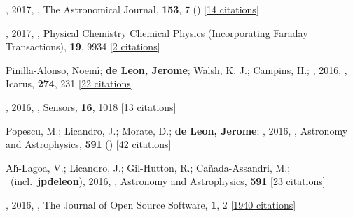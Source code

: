 \item[{\color{numcolor}\scriptsize73}] , 2017, , The Astronomical Journal, \textbf{153}, 7 () [\href{https://ui.adsabs.harvard.edu/abs/2017AJ....153....7Y}{14 citations}]

\item[{\color{numcolor}\scriptsize72}] , 2017, , Physical Chemistry Chemical Physics (Incorporating Faraday Transactions), \textbf{19}, 9934 [\href{https://ui.adsabs.harvard.edu/abs/2017PCCP...19.9934D}{2 citations}]

\item[{\color{numcolor}\scriptsize71}] Pinilla-Alonso, Noem{\'\i}; \textbf{de Leon, Jerome}; Walsh, K. J.; Campins, H.; \etal, 2016, , Icarus, \textbf{274}, 231 [\href{https://ui.adsabs.harvard.edu/abs/2016Icar..274..231P}{22 citations}]

\item[{\color{numcolor}\scriptsize70}] , 2016, , Sensors, \textbf{16}, 1018 [\href{https://ui.adsabs.harvard.edu/abs/2016Senso..16.1018R}{13 citations}]

\item[{\color{numcolor}\scriptsize69}] Popescu, M.; Licandro, J.; Morate, D.; \textbf{de Leon, Jerome}; \etal, 2016, , Astronomy and Astrophysics, \textbf{591} () [\href{https://ui.adsabs.harvard.edu/abs/2016A&A...591A.115P}{42 citations}]

\item[{\color{numcolor}\scriptsize68}] Al{\'\i}-Lagoa, V.; Licandro, J.; Gil-Hutton, R.; Ca{\~n}ada-Assandri, M.; \etal\ (incl.\ \textbf{jpdeleon}), 2016, , Astronomy and Astrophysics, \textbf{591} [\href{https://ui.adsabs.harvard.edu/abs/2016A&A...591A..14A}{23 citations}]

\item[{\color{numcolor}\scriptsize67}] , 2016, , The Journal of Open Source Software, \textbf{1}, 2 [\href{https://scholar.google.com/scholar?cites=1835087844145558435,17325274697099535179,14220488595059618709,12820425635803494730,7284810048757141243,17415935839493019063}{1940 citations}]

